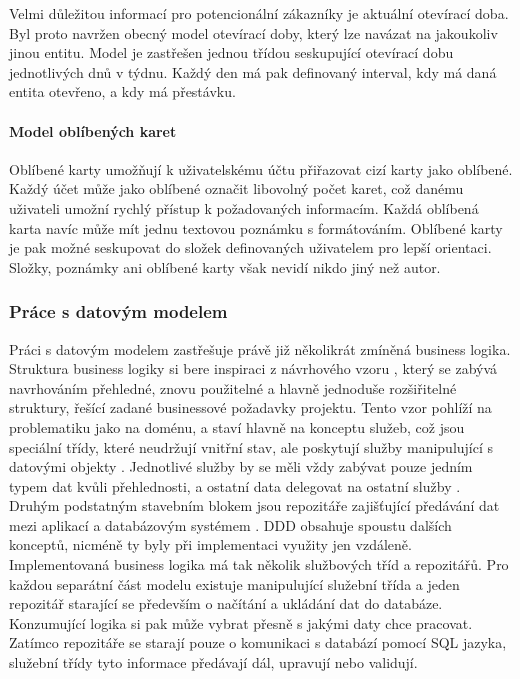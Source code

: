 		Velmi důležitou informací pro potencionální zákazníky je aktuální otevírací doba.
		Byl proto navržen obecný model otevírací doby, který lze navázat na jakoukoliv jinou entitu.
		Model je zastřešen jednou třídou seskupující otevírací dobu jednotlivých dnů v týdnu.
		Každý den má pak definovaný interval, kdy má daná entita otevřeno, a kdy má přestávku.

		\newpage

		\paragraph{Model oblíbených karet}

		Oblíbené karty umožňují k uživatelskému účtu přiřazovat cizí karty jako oblíbené.
		Každý účet může jako oblíbené označit libovolný počet karet, což danému uživateli umožní rychlý přístup
		k požadovaných informacím.
		Každá oblíbená karta navíc může mít jednu textovou poznámku s formátováním.
		Oblíbené karty je pak možné seskupovat do složek definovaných uživatelem pro lepší orientaci.
		Složky, poznámky ani oblíbené karty však nevidí nikdo jiný než autor.


		\subsubsection{Práce s datovým modelem}

		Práci s datovým modelem zastřešuje právě již několikrát zmíněná business logika.
		Struktura business logiky si bere inspiraci z návrhového vzoru , který se zabývá
		navrhováním přehledné, znovu použitelné a hlavně jednoduše rozšiřitelné struktury, řešící zadané businessové požadavky
		projektu.
		Tento vzor pohlíží na problematiku jako na doménu, a staví hlavně na konceptu služeb,
		což jsou speciální třídy, které
		neudržují vnitřní stav, ale poskytují služby manipulující s datovými objekty \cite{ddd_quickly}.
		Jednotlivé služby by se měli vždy zabývat pouze jedním typem dat kvůli přehlednosti, a ostatní data delegovat na
		ostatní služby \cite{ddd_quickly}.
		Druhým podstatným stavebním blokem jsou repozitáře zajišťující předávání dat mezi aplikací a databázovým systémem
		\cite{ddd_quickly}.
		\ac{DDD} obsahuje spoustu dalších konceptů, nicméně ty byly při implementaci využity jen vzdáleně.
		Implementovaná business logika má tak několik službových tříd a repozitářů.
		Pro každou separátní část modelu existuje manipulující služební třída a jeden repozitář starající se především o
		načítání a ukládání dat do databáze.
		Konzumující logika si pak může vybrat přesně s jakými daty chce pracovat.
		Zatímco repozitáře se starají pouze o komunikaci s databází pomocí \ac{SQL} jazyka,
		služební třídy tyto informace předávají dál, upravují nebo validují.

